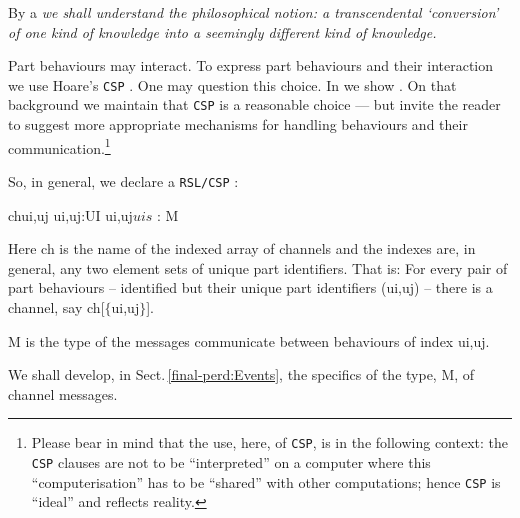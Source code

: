 \begynd
\pind  By a   
\begynd
\pind \sl we shall understand the philosophical notion: 
\pind a transcendental `conversion' of one kind of knowledge 
\pind into a seemingly different kind of know\-ledge.\rm
\afslut
\afslut

\label{Channels}

\begynd
\pind Part behaviours may interact.
\begynd
\pind To express part behaviours and their interaction
\pind we use \textsf{Hoare}'s \texttt{CSP} \cite{Hoa78a,Hoare85,Hoare85+2004}.
\begynd
\pind One may question this choice. 
\pind In \cite[]{dines:hoare:2009,BjornerMereology2013,BjornerMereologyCSP2017}
      we show .
\pind On that background we maintain that \texttt{CSP} is a reasonable
      choice ---
\pind but invite the reader to suggest more appropriate mechanisms for
      handling behaviours and their communication.\footnote{%
\pind Please bear in mind that the use, here, of  \texttt{CSP}, is in the following context:
\begynd
\pind the \texttt{CSP} clauses are not to be ``interpreted'' on a computer
\pind where this ``computerisation'' has to be ``shared''
\pind with other computations;
\pind hence \texttt{CSP}  is ``ideal''
\pind and reflects reality.
\afslut}
\afslut

\pind So, in general, we declare a \texttt{RSL/CSP} :
\afslut

\bp
\>\> {\LBRACE} ch{\LBRACKET}{\LBRACE}ui,uj{\RBRACE}{\RBRACKET} {\BAR} ui,uj:UI {\RDOT} {\LBRACE}ui,uj{\RBRACE}{\SUBSETEQ}$uis$ {\RBRACE} : M
\ep
\eff

\noindent
\begynd
\pind Here \textsf{ch} is the name of the indexed array of channels
      and the indexes are, in general, any two element sets of unique
      part identifiers.
\pind That is: For every pair of part behaviours -- 
\pind identified but their unique part identifiers (\textsf{ui,uj}) --
\pind there is a channel, say \textsf{ch[$\{$ui,uj$\}$]}.

\pind \textsf{M} is the type of the messages communicate between
behaviours of index \textsf{ui,uj}.

\pind We shall develop, in Sect.\,\vref{final-perd:Events}, the specifics of the type, \textsf{M}, of channel messages.
\afslut

